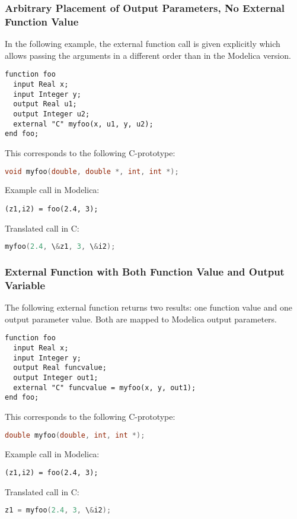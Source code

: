 \subsubsection{Arbitrary Placement of Output Parameters, No External Function Value}

\begin{example}
In the following example, the external function call is given
explicitly which allows passing the arguments in a different order than
in the Modelica version.
\begin{lstlisting}[language=modelica]
function foo
  input Real x;
  input Integer y;
  output Real u1;
  output Integer u2;
  external "C" myfoo(x, u1, y, u2);
end foo;
\end{lstlisting}
This corresponds to the following C-prototype:
\begin{lstlisting}[language=C]
void myfoo(double, double *, int, int *);
\end{lstlisting}
Example call in Modelica:
\begin{lstlisting}[language=modelica]
(z1,i2) = foo(2.4, 3);
\end{lstlisting}
Translated call in C:
\begin{lstlisting}[language=C]
myfoo(2.4, \&z1, 3, \&i2);
\end{lstlisting}
\end{example}

\subsubsection{External Function with Both Function Value and Output Variable}

\begin{example}
The following external function returns two results: one
function value and one output parameter value. Both are mapped to
Modelica output parameters.
\begin{lstlisting}[language=modelica]
function foo
  input Real x;
  input Integer y;
  output Real funcvalue;
  output Integer out1;
  external "C" funcvalue = myfoo(x, y, out1);
end foo;
\end{lstlisting}
This corresponds to the following C-prototype:
\begin{lstlisting}[language=C]
double myfoo(double, int, int *);
\end{lstlisting}
Example call in Modelica:
\begin{lstlisting}[language=modelica]
(z1,i2) = foo(2.4, 3);
\end{lstlisting}
Translated call in C:
\begin{lstlisting}[language=C]
z1 = myfoo(2.4, 3, \&i2);
\end{lstlisting}
\end{example}

